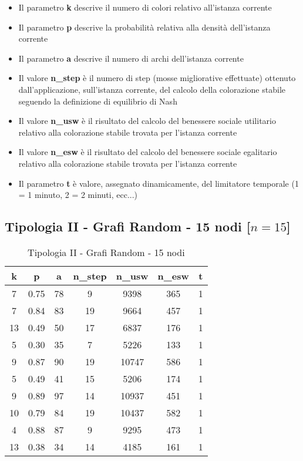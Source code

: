 \begin{itemize}
	\item Il parametro \textbf{k} descrive il numero di colori relativo all'istanza corrente
	\item Il parametro \textbf{p} descrive la probabilità relativa alla densità dell'istanza corrente
	\item Il parametro \textbf{a} descrive il numero di archi dell'istanza corrente
	\item Il valore \textbf{n\_step} è il numero di step (mosse migliorative effettuate) ottenuto dall'applicazione, sull'istanza corrente, del calcolo della colorazione stabile seguendo la definizione di equilibrio di Nash
	\item Il valore \textbf{n\_usw} è il risultato del calcolo del benessere sociale utilitario relativo alla colorazione stabile trovata per l'istanza corrente
	\item Il valore \textbf{n\_esw} è il risultato del calcolo del benessere sociale egalitario relativo alla colorazione stabile trovata per l'istanza corrente
	\item Il parametro \textbf{t} è valore, assegnato dinamicamente, del limitatore temporale (1 = 1 minuto, 2 = 2 minuti, ecc...)
\end{itemize}

\subsection{Tipologia II - Grafi Random - 15 nodi [$n=15$]}

\begin{table}[H]
\centering
\begin{tabular}{|c|c|c|c|c|c|c|}
\hline
\textbf{k} & \textbf{p} & \textbf{a} & \textbf{n\_step} & \textbf{n\_usw} & \textbf{n\_esw} & \textbf{t} \\ \hline
7 & 0.75 & 78 & 9 & 9398 & 365 & 1 \\ \hline
7 & 0.84 & 83 & 19 & 9664 & 457 & 1 \\ \hline
13 & 0.49 & 50 & 17 & 6837 & 176 & 1 \\ \hline
5 & 0.30 & 35 & 7 & 5226 & 133 & 1 \\ \hline
9 & 0.87 & 90 & 19 & 10747 & 586 & 1 \\ \hline
5 & 0.49 & 41 & 15 & 5206 & 174 & 1 \\ \hline
9 & 0.89 & 97 & 14 & 10937 & 451 & 1 \\ \hline
10 & 0.79 & 84 & 19 & 10437 & 582 & 1 \\ \hline
4 & 0.88 & 87 & 9 & 9295 & 473 & 1 \\ \hline
13 & 0.38 & 34 & 14 & 4185 & 161 & 1 \\ \hline
\end{tabular}
\caption{Tipologia II - Grafi Random - 15 nodi}
\label{tab:sperimentazione-tipo1-15nodi}
\end{table}

